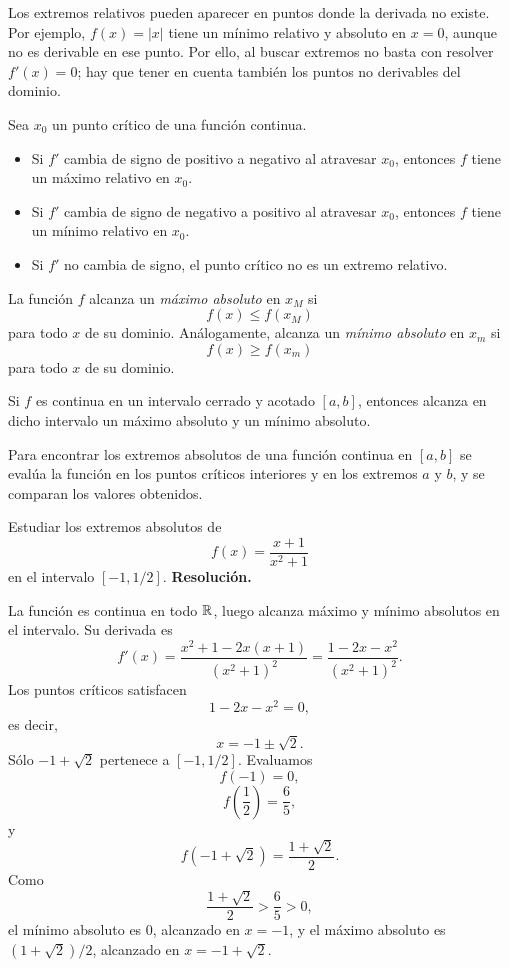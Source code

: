 Los extremos relativos pueden aparecer en puntos donde la derivada no existe. Por ejemplo, $f(x)=|x|$ tiene un mínimo relativo y absoluto en $x=0$, aunque no es derivable en ese punto. Por ello, al buscar extremos no basta con resolver $f'(x)=0$; hay que tener en cuenta también los puntos no derivables del dominio.

\begin{theorem}
Sea $x_0$ un punto crítico de una función continua.
\begin{itemize}
\item Si $f'$ cambia de signo de positivo a negativo al atravesar $x_0$, entonces $f$ tiene un máximo relativo en $x_0$.
\item Si $f'$ cambia de signo de negativo a positivo al atravesar $x_0$, entonces $f$ tiene un mínimo relativo en $x_0$.
\item Si $f'$ no cambia de signo, el punto crítico no es un extremo relativo.
\end{itemize}
\end{theorem}

\begin{definition}
La función $f$ alcanza un \emph{máximo absoluto} en $x_M$ si
\[
f(x)\leq f(x_M)
\]
para todo $x$ de su dominio. Análogamente, alcanza un \emph{mínimo absoluto} en $x_m$ si
\[
f(x)\geq f(x_m)
\]
para todo $x$ de su dominio.
\end{definition}

\begin{theorem}
Si $f$ es continua en un intervalo cerrado y acotado $[a,b]$, entonces alcanza en dicho intervalo un máximo absoluto y un mínimo absoluto.
\end{theorem}

Para encontrar los extremos absolutos de una función continua en $[a,b]$ se evalúa la función en los puntos críticos interiores y en los extremos $a$ y $b$, y se comparan los valores obtenidos.

\begin{solvedexercise}
Estudiar los extremos absolutos de
\[
f(x)=\frac{x+1}{x^2+1}
\]
en el intervalo $[-1,1/2]$.
\tcblower
\textbf{Resolución.}\par\smallskip
La función es continua en todo $\mathbb{R}$, luego alcanza máximo y mínimo absolutos en el intervalo. Su derivada es
\[
f'(x)=\frac{x^2+1-2x(x+1)}{(x^2+1)^2}
=
\frac{1-2x-x^2}{(x^2+1)^2}.
\]
Los puntos críticos satisfacen
\[
1-2x-x^2=0,
\]
es decir,
\[
x=-1\pm\sqrt2.
\]
Sólo $-1+\sqrt2$ pertenece a $[-1,1/2]$. Evaluamos
\[
f(-1)=0,
\]
\[
f\left(\frac12\right)=\frac{6}{5},
\]
y
\[
f(-1+\sqrt2)=\frac{1+\sqrt2}{2}.
\]
Como
\[
\frac{1+\sqrt2}{2}>\frac65>0,
\]
el mínimo absoluto es $0$, alcanzado en $x=-1$, y el máximo absoluto es $(1+\sqrt2)/2$, alcanzado en $x=-1+\sqrt2$.
\end{solvedexercise}


